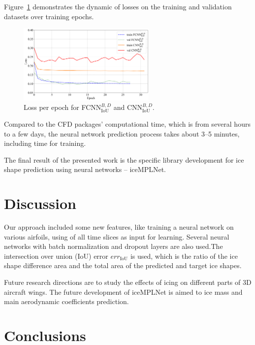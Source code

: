 \documentclass[aerospace,article,submit,moreauthors,pdftex]{Definitions/mdpi}
\begin{document}
Figure~\ref{fig:EpochFig} demonstrates the dynamic of losses on the training and validation datasets over training epochs. 

\begin{figure}[H]
\includegraphics[width=0.6\textwidth]{Figures/EpochFig.png}
\caption{Loss per epoch for FCNN$_{\text{IoU}}^{B,D}$ and CNN$_{\text{IoU}}^{B,D}$.\label{fig:EpochFig}}
\end{figure} 

Compared to the CFD packages' computational time, which is from several hours to a few days, the neural network prediction process takes about 3--5 minutes, including time for training. 

The final result of the presented work is the specific library development for ice shape prediction using neural networks -- iceMPLNet.   

\section{Discussion \label{sec:discuss}}

Our approach included some new features, like training a neural network on various airfoils, using of all time slices as input for learning.
Several neural networks with batch normalization and dropout layers are also used.The intersection over union (IoU) error $err_{\text{IoU}}$ is used, which is the ratio of the ice shape difference area and the total area of the predicted and target ice shapes.

Future research directions are to study the effects of icing on different parts of 3D aircraft wings. The future development of iceMPLNet is aimed to ice mass and main aerodynamic coefficients prediction. 

\section{Conclusions \label{sec:Conclus}}
\end{document}
